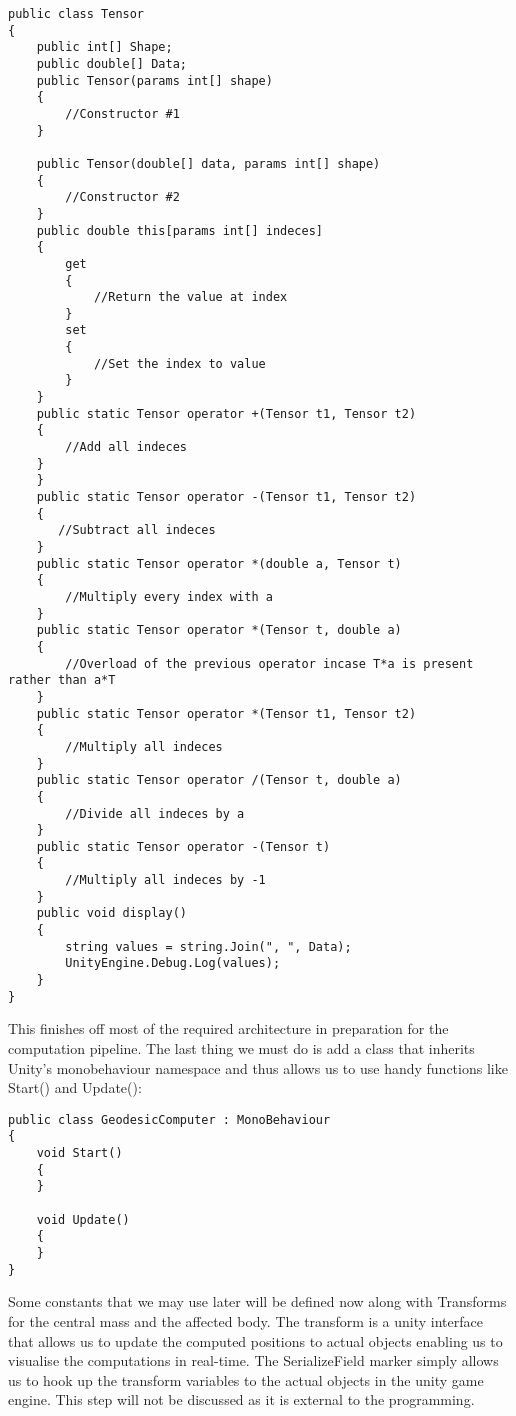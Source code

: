 \documentclass{article}
\begin{document}
\begin{verbatim}
public class Tensor
{
    public int[] Shape;
    public double[] Data;
    public Tensor(params int[] shape)
    {
        //Constructor #1
    }

    public Tensor(double[] data, params int[] shape)
    {
        //Constructor #2
    }
    public double this[params int[] indeces]
    {
        get
        {
            //Return the value at index
        }
        set
        {
            //Set the index to value
        }
    }
    public static Tensor operator +(Tensor t1, Tensor t2)
    {
        //Add all indeces
    }
    }
    public static Tensor operator -(Tensor t1, Tensor t2)
    {
       //Subtract all indeces
    }
    public static Tensor operator *(double a, Tensor t)
    {
        //Multiply every index with a
    }
    public static Tensor operator *(Tensor t, double a)
    {
        //Overload of the previous operator incase T*a is present rather than a*T
    }
    public static Tensor operator *(Tensor t1, Tensor t2)
    {
        //Multiply all indeces
    }
    public static Tensor operator /(Tensor t, double a)
    {
        //Divide all indeces by a
    }
    public static Tensor operator -(Tensor t)
    {
        //Multiply all indeces by -1
    }
    public void display()
    {
        string values = string.Join(", ", Data);
        UnityEngine.Debug.Log(values);
    }
}
\end{verbatim}

\newpage
This finishes off most of the required architecture in preparation for the computation pipeline. The last thing we must do is add a class that inherits Unity's monobehaviour namespace and thus allows us to use handy functions like Start() and Update():

\begin{verbatim}
public class GeodesicComputer : MonoBehaviour
{
    void Start()
    {
    }

    void Update()
    {
    }
}
\end{verbatim}

Some constants that we may use later will be defined now along with Transforms for the central mass and the affected body. The transform is a unity interface that allows us to update the computed positions to actual objects enabling us to visualise the computations in real-time. The SerializeField marker simply allows us to hook up the transform variables to the actual objects in the unity game engine. This step will not be discussed as it is external to the programming.
\end{document}
